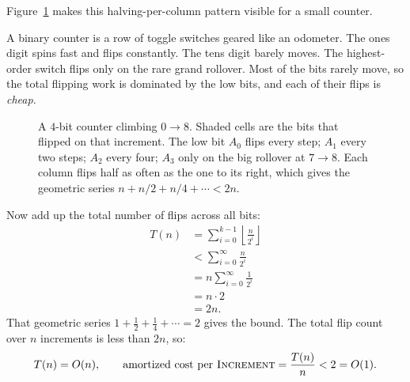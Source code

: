 Figure~\ref{ch17:counter-flips} makes this halving-per-column pattern visible for a
small counter.

\begin{intuitionbox}
A binary counter is a row of toggle switches geared like an odometer. The ones
digit spins fast and flips constantly. The tens digit barely moves. The
highest-order switch flips only on the rare grand rollover. Most of the bits
rarely move, so the total flipping work is dominated by the low bits, and each of
their flips is \emph{cheap}.
\end{intuitionbox}

\begin{figure}[h]
\centering
{}
\caption{A $4$-bit counter climbing $0 \to 8$. Shaded cells are the bits that
flipped on that increment. The low bit $A_0$ flips every step; $A_1$ every two
steps; $A_2$ every four; $A_3$ only on the big rollover at $7 \to 8$. Each column
flips half as often as the one to its right, which gives the geometric series
$n + n/2 + n/4 + \cdots < 2n$.}
\label{ch17:counter-flips}
\end{figure}

Now add up the total number of flips across all bits:
\begin{align*}
  T(n) &= \sum_{i=0}^{k-1} \left\lfloor \frac{n}{2^i} \right\rfloor \\
  &< \sum_{i=0}^{\infty} \frac{n}{2^i} \\
  &= n \sum_{i=0}^{\infty} \frac{1}{2^i} \\
  &= n \cdot 2 \\
  &= 2n.
\end{align*}
That geometric series $1 + \tfrac12 + \tfrac14 + \cdots = 2$ gives the bound.
The total flip count over $n$ increments is less than $2n$, so:
\[
  T(n) = O(n), \qquad \text{amortized cost per \textsc{Increment}} = \frac{T(n)}{n} < 2 = O(1).
\]

